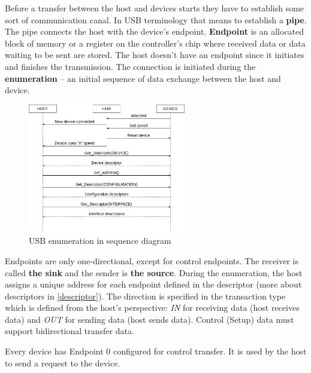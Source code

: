 Before a transfer between the host and devices starts they have to establish some sort of communication canal. In USB terminology that means to establish a \textbf{pipe}. The pipe connects the host with the device's endpoint. \textbf{Endpoint} is an allocated block of memory or a register on the controller's chip where received data or data waiting to be sent are stored. The host doesn't have an endpoint since it initiates and finishes the transmission. The connection is initiated during the \textbf{enumeration} -- an initial sequence of data exchange between the host and device.

\begin{figure}[ht]
    \centering
    \includegraphics[width=260px]{obrazky-figures/enumeration.png}
    \caption{USB enumeration in sequence diagram}
    \label{fig:enumeration}
\end{figure}

Endpoints are only one-directional, except for control endpoints. The receiver is called \textbf{the sink} and the sender is \textbf{the source}. During the enumeration, the host assigns a unique address for each endpoint defined in the descriptor (more about descriptors in \autoref{descriptor}). The direction is specified in the transaction type which is defined from the host's perspective: \emph{IN} for receiving data (host receives data) and \emph{OUT} for sending data (host sends data). Control (Setup) data must support bidirectional transfer data.

Every device has Endpoint 0 configured for control transfer. It is used by the host to send a request to the device.

